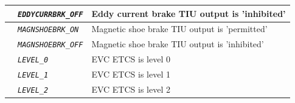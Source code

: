 \documentclass{template/openetcs}
\begin{document}
\begin{itemize}
\begin{longtable}{|l|l|l|}
			\hline

			&	\begin{minipage}[t]{0.40\linewidth} \emph{\texttt{EDDYCURRBRK\_OFF}} \end{minipage}
			&	\begin{minipage}[t]{0.38\linewidth} Eddy current brake TIU output is ’inhibited’ \end{minipage} \\ 

			\hline

			&	\begin{minipage}[t]{0.40\linewidth} \emph{\texttt{MAGNSHOEBRK\_ON}} \end{minipage}
			&	\begin{minipage}[t]{0.38\linewidth} Magnetic shoe brake TIU output is ’permitted’ \end{minipage} \\ 

			\hline

			&	\begin{minipage}[t]{0.40\linewidth} \emph{\texttt{MAGNSHOEBRK\_OFF}} \end{minipage}
			&	\begin{minipage}[t]{0.38\linewidth} Magnetic shoe brake TIU output is ’inhibited’ \end{minipage} \\ 

			\hline

			&	\begin{minipage}[t]{0.40\linewidth} \emph{\texttt{LEVEL\_0}} \end{minipage}
			&	\begin{minipage}[t]{0.38\linewidth} EVC ETCS is level 0 \end{minipage} \\ 

			\hline

			&	\begin{minipage}[t]{0.40\linewidth} \emph{\texttt{LEVEL\_1}} \end{minipage}
			&	\begin{minipage}[t]{0.38\linewidth} EVC ETCS is level 1 \end{minipage} \\ 

			\hline

			&	\begin{minipage}[t]{0.40\linewidth} \emph{\texttt{LEVEL\_2}} \end{minipage}
			&	\begin{minipage}[t]{0.38\linewidth} EVC ETCS is level 2 \end{minipage} \\ 


\end{longtable}
\end{itemize}
\end{document}
